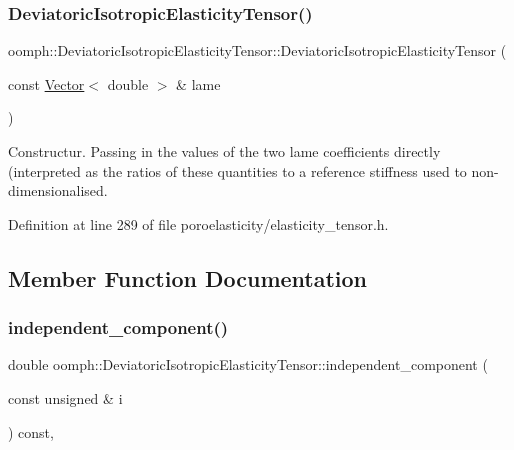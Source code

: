 \subsubsection{\texorpdfstring{Deviatoric\+Isotropic\+Elasticity\+Tensor()}{DeviatoricIsotropicElasticityTensor()}\hspace{0.1cm}{\footnotesize\ttfamily [4/4]}}
{\footnotesize\ttfamily oomph\+::\+Deviatoric\+Isotropic\+Elasticity\+Tensor\+::\+Deviatoric\+Isotropic\+Elasticity\+Tensor (\begin{DoxyParamCaption}\item[{const \hyperlink{classoomph_1_1Vector}{Vector}$<$ double $>$ \&}]{lame }\end{DoxyParamCaption})\hspace{0.3cm}{\ttfamily [inline]}}



Constructur. Passing in the values of the two lame coefficients directly (interpreted as the ratios of these quantities to a reference stiffness used to non-\/dimensionalised. 



Definition at line 289 of file poroelasticity/elasticity\+\_\+tensor.\+h.



\subsection{Member Function Documentation}
\mbox{\label{classoomph_1_1DeviatoricIsotropicElasticityTensor_ab9861d265cbc24c5fa6b55f0613ead8b}} 
\subsubsection{\texorpdfstring{independent\+\_\+component()}{independent\_component()}}
{\footnotesize\ttfamily double oomph\+::\+Deviatoric\+Isotropic\+Elasticity\+Tensor\+::independent\+\_\+component (\begin{DoxyParamCaption}\item[{const unsigned \&}]{i }\end{DoxyParamCaption}) const\hspace{0.3cm}{\ttfamily [inline]}, {\ttfamily [virtual]}}




